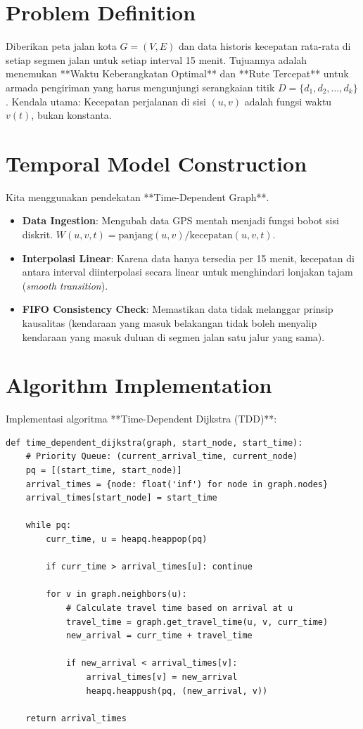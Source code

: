 \documentclass[12pt,a4paper]{book}
\begin{document}
\section{Problem Definition}
Diberikan peta jalan kota $G=(V, E)$ dan data historis kecepatan rata-rata di setiap segmen jalan untuk setiap interval 15 menit.
Tujuannya adalah menemukan **Waktu Keberangkatan Optimal** dan **Rute Tercepat** untuk armada pengiriman yang harus mengunjungi serangkaian titik $D = \{d_1, d_2, \dots, d_k\}$.
Kendala utama: Kecepatan perjalanan di sisi $(u, v)$ adalah fungsi waktu $v(t)$, bukan konstanta.

\section{Temporal Model Construction}
Kita menggunakan pendekatan **Time-Dependent Graph**.
\begin{itemize}
    \item \textbf{Data Ingestion}: Mengubah data GPS mentah menjadi fungsi bobot sisi diskrit. $W(u, v, t) = \text{panjang}(u, v) / \text{kecepatan}(u, v, t)$.
    \item \textbf{Interpolasi Linear}: Karena data hanya tersedia per 15 menit, kecepatan di antara interval diinterpolasi secara linear untuk menghindari lonjakan tajam (\textit{smooth transition}).
    \item \textbf{FIFO Consistency Check}: Memastikan data tidak melanggar prinsip kausalitas (kendaraan yang masuk belakangan tidak boleh menyalip kendaraan yang masuk duluan di segmen jalan satu jalur yang sama).
\end{itemize}

\section{Algorithm Implementation}
Implementasi algoritma **Time-Dependent Dijkstra (TDD)**:
\begin{verbatim}
def time_dependent_dijkstra(graph, start_node, start_time):
    # Priority Queue: (current_arrival_time, current_node)
    pq = [(start_time, start_node)]
    arrival_times = {node: float('inf') for node in graph.nodes}
    arrival_times[start_node] = start_time
    
    while pq:
        curr_time, u = heapq.heappop(pq)
        
        if curr_time > arrival_times[u]: continue
            
        for v in graph.neighbors(u):
            # Calculate travel time based on arrival at u
            travel_time = graph.get_travel_time(u, v, curr_time)
            new_arrival = curr_time + travel_time
            
            if new_arrival < arrival_times[v]:
                arrival_times[v] = new_arrival
                heapq.heappush(pq, (new_arrival, v))
                
    return arrival_times
\end{verbatim}
\end{document}
